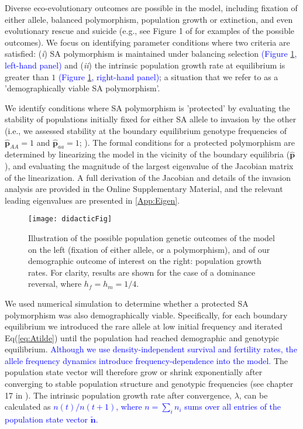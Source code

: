 \documentclass[11pt]{article}
\def\mbf#1{\mathbf{#1}}
\begin{document}
Diverse eco-evolutionary outcomes are possible in the model, including fixation of either allele, balanced polymorphism, population growth or extinction, and even evolutionary rescue and suicide (e.g., see Figure 1 of \citealt{deVriesCaswell2019a, deVriesCaswell2019b} for examples of the possible outcomes). We focus on identifying parameter conditions where two criteria are satisfied: ({\itshape i}) SA polymorphism is maintained under balancing selection \textcolor{blue}{(Figure \ref{fig:didactic}, left-hand panel)} and ({\itshape ii}) the intrinsic population growth rate at equilibrium is greater than $1$ \textcolor{blue}{(Figure \ref{fig:didactic}, right-hand panel)}; a situation that we refer to as a 'demographically viable SA polymorphism'.

We identify conditions where SA polymorphism is 'protected' by evaluating the stability of populations initially fixed for either SA allele to invasion by the other (i.e., we assessed stability at the boundary equilibrium genotype frequencies of $\hat{\mbf{p}}_{AA} = 1$ and $\hat{\mbf{p}}_{aa} = 1$; \citealt{Levene1953, Prout1968, deVriesCaswell2019b}). The formal conditions for a protected polymorphism are determined by linearizing the model in the vicinity of the boundary equilibria ($\hat{\mbf{p}}$), and evaluating the magnitude of the largest eigenvalue of the Jacobian matrix of the linearization. A full derivation of the Jacobian and details of the invasion analysis are provided in the Online Supplementary Material, and the relevant leading eigenvalues are presented in \ref{App:Eigen}.

 \begin{figure}[htbp]
 \centering
 \texttt{[image: didacticFig]}
 \caption{\footnotesize{Illustration of the possible population genetic outcomes of the model on the left (fixation of either allele, or a polymorphism), and of our demographic outcome of interest on the right:  population growth rates. For clarity, results are shown for the case of a dominance reversal, where $h_f = h_m = 1/4$.}}
 \label{fig:didactic}
 \end{figure}

We used numerical simulation to determine whether a protected SA polymorphism was also demographically viable. Specifically, for each boundary equilibrium we introduced the rare allele at low initial frequency and iterated Eq(\ref{eq:Atilde}) until the population had reached demographic and genotypic equilibrium. \textcolor{blue}{Although we use density-independent survival and fertility rates, the allele frequency dynamics introduce frequency-dependence into the model.} The population state vector will therefore grow or shrink exponentially after converging to stable population structure and genotypic frequencies (see chapter 17 in \citealt{Caswell2001}). The intrinsic population growth rate after convergence, $\lambda$, can be calculated as \textcolor{blue}{ $n(t)/n(t+1)$, where $n = \sum_i n_i $ sums over all entries of the population state vector $\tilde{\mbf{n}}$.}
\end{document}
